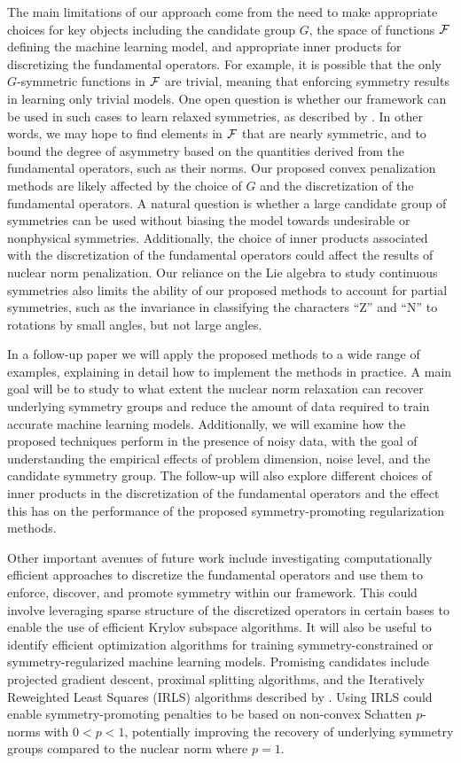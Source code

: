 \documentclass[twoside,11pt]{article}
\begin{document}
The main limitations of our approach come from the need to make appropriate choices for key objects including the candidate group $G$, the space of functions ${\mathcal{F}}$ defining the machine learning model, and appropriate inner products for discretizing the fundamental operators. 
For example, it is possible that the only $G$-symmetric functions in ${\mathcal{F}}$ are trivial, meaning that enforcing symmetry results in learning only trivial models.
One open question is whether our framework can be used in such cases to learn relaxed symmetries, as described by \cite{Wang2022approximately}.
In other words, we may hope to find elements in ${\mathcal{F}}$ that are nearly symmetric, and to bound the degree of asymmetry based on the quantities derived from the fundamental operators, such as their norms.
Our proposed convex penalization methods are likely affected by the choice of $G$ and the discretization of the fundamental operators.
A natural question is whether a large candidate group of symmetries can be used without biasing the model towards undesirable or nonphysical symmetries.
Additionally, the choice of inner products associated with the discretization of the fundamental operators could affect the results of nuclear norm penalization.
Our reliance on the Lie algebra to study continuous symmetries also limits the ability of our proposed methods to account for partial symmetries, such as the invariance in classifying the characters ``Z'' and ``N'' to rotations by small angles, but not large angles.

In a follow-up paper we will apply the proposed methods to a wide range of examples, explaining in detail how to implement the methods in practice.
A main goal will be to study to what extent the nuclear norm relaxation can recover underlying symmetry groups and reduce the amount of data required to train accurate machine learning models.
Additionally, we will examine how the proposed techniques perform in the presence of noisy data, with the goal of understanding the empirical effects of problem dimension, noise level, and the candidate symmetry group.
The follow-up will also explore different choices of inner products in the discretization of the fundamental operators and the effect this has on the performance of the proposed symmetry-promoting regularization methods.

Other important avenues of future work include investigating computationally efficient approaches to discretize the fundamental operators and use them to enforce, discover, and promote symmetry within our framework.
This could involve leveraging sparse structure of the discretized operators in certain bases to enable the use of efficient Krylov subspace algorithms.
It will also be useful to identify efficient optimization algorithms for training symmetry-constrained or symmetry-regularized machine learning models.
Promising candidates include projected gradient descent, proximal splitting algorithms, and the Iteratively Reweighted Least Squares (IRLS) algorithms described by \cite{Mohan2012iterative}.
Using IRLS could enable symmetry-promoting penalties to be based on non-convex Schatten $p$-norms with $0 < p < 1$, potentially improving the recovery of underlying symmetry groups compared to the nuclear norm where $p=1$.
\end{document}
